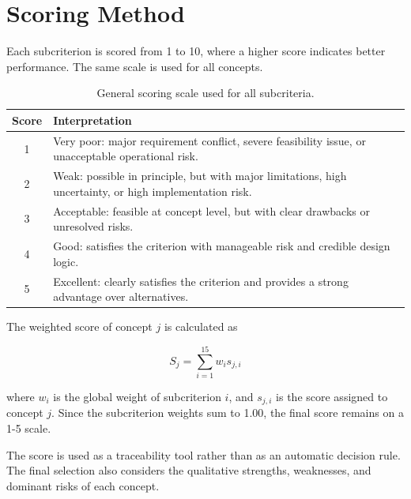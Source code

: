 \section{Scoring Method}

Each subcriterion is scored from 1 to 10, where a higher score indicates better performance. The same scale is used for all concepts.

\begin{table}[H]
\centering
\small
\caption{General scoring scale used for all subcriteria.}
\label{tab:scoring_scale}
\begin{tabularx}{0.88\textwidth}{c X}
\toprule
\textbf{Score} & \textbf{Interpretation} \\
\midrule
1 & Very poor: major requirement conflict, severe feasibility issue, or unacceptable operational risk. \\
2 & Weak: possible in principle, but with major limitations, high uncertainty, or high implementation risk. \\
3 & Acceptable: feasible at concept level, but with clear drawbacks or unresolved risks. \\
4 & Good: satisfies the criterion with manageable risk and credible design logic. \\
5 & Excellent: clearly satisfies the criterion and provides a strong advantage over alternatives. \\
\bottomrule
\end{tabularx}
\end{table}

The weighted score of concept \(j\) is calculated as

\begin{equation}
S_j = \sum_{i=1}^{15} w_i s_{j,i}
\label{eq:tradeoff_score}
\end{equation}

where \(w_i\) is the global weight of subcriterion \(i\), and \(s_{j,i}\) is the score assigned to concept \(j\). Since the subcriterion weights sum to 1.00, the final score remains on a 1-5 scale.

The score is used as a traceability tool rather than as an automatic decision rule. The final selection also considers the qualitative strengths, weaknesses, and dominant risks of each concept.






